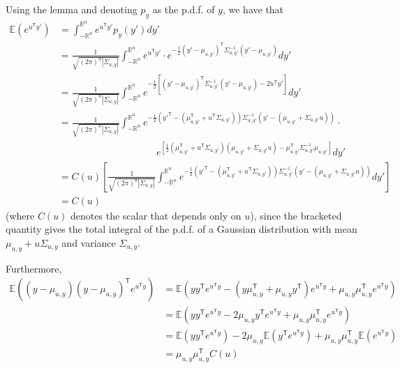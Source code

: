 \documentclass[a4paper,12pt]{article}
\theoremstyle{remark}
\newcommand{\transpose}{\mathsf{T}}
\begin{document}
    Using the lemma and denoting $p_y$ as the p.d.f. of $y$, we have that
    \begin{align*}
        \mathbb{E}(e^{u^\transpose y'}) &= \int_{-\mathbb{R}^n}^{\mathbb{R}^n} e^{u^\transpose y'} p_y(y') dy' \\
        &= \frac{1}{\sqrt{(2\pi)^n |\Sigma_{u, y}|}} \int_{-\mathbb{R}^n}^{\mathbb{R}^n} e^{u^\transpose y'} \cdot e^{-\frac{1}{2} (y' - \mu_{u, y'})^\transpose \Sigma_{u, y'}^{-1} (y' - \mu_{u, y'})} dy' \\
        &= \frac{1}{\sqrt{(2\pi)^n |\Sigma_{u, y}|}} \int_{-\mathbb{R}^n}^{\mathbb{R}^n} e^{-\frac{1}{2} [(y' - \mu_{u, y'})^\transpose \Sigma_{u, y'}^{-1} (y' - \mu_{u, y'}) - 2u^\transpose y']} dy' \\
        &= \frac{1}{\sqrt{(2\pi)^n |\Sigma_{u, y}|}} \int_{-\mathbb{R}^n}^{\mathbb{R}^n} e^{-\frac{1}{2} (y'^\transpose - (\mu_{u, y'}^\transpose + u^\transpose \Sigma_{u, y'})) \Sigma_{u, y'}^{-1} (y' - (\mu_{u, y'} + \Sigma_{u, y'} u))} \cdot \text{} \\
        &\qquad\qquad\qquad\qquad\qquad e^{[\frac{1}{2}(\mu_{u, y'}^\transpose + u^\transpose \Sigma_{u, y'})(\mu_{u, y'} + \Sigma_{u, y'} u) - \mu_{u, y'}^\transpose \Sigma_{u, y'}^{-1} \mu_{u, y'}]} dy' \\
        &= C(u) \left[ \frac{1}{\sqrt{(2\pi)^n |\Sigma_{u, y}|}} \int_{-\mathbb{R}^n}^{\mathbb{R}^n} e^{-\frac{1}{2} (y'^\transpose - (\mu_{u, y'}^\transpose + u^\transpose \Sigma_{u, y'})) \Sigma_{u, y'}^{-1} (y' - (\mu_{u, y'} + \Sigma_{u, y'} u))} dy' \right] \\
        &= C(u)
    \end{align*}
    (where $C(u)$ denotes the scalar that depends only on $u$), since the bracketed quantity gives the total integral of the p.d.f. of a Gaussian distribution with mean $\mu_{u, y} + u\Sigma_{u, y}$ and variance $\Sigma_{u, y}$. \par
    Furthermore,
    \begin{align*}
        \mathbb{E}((y - \mu_{u, y})(y - \mu_{u, y})^\transpose e^{u^\transpose y}) &= \mathbb{E}(yy^\transpose e^{u^\transpose y} - (y\mu_{u, y}^\transpose + \mu_{u, y} y^\transpose) e^{u^\transpose y} + \mu_{u, y} \mu_{u, y}^\transpose e^{u^\transpose y}) \\
        &= \mathbb{E}(yy^\transpose e^{u^\transpose y} - 2\mu_{u, y} y^\transpose e^{u^\transpose y} + \mu_{u, y} \mu_{u, y}^\transpose e^{u^\transpose y}) \\
        &= \mathbb{E}(yy^\transpose e^{u^\transpose y}) - 2\mu_{u, y} \mathbb{E}(y^\transpose e^{u^\transpose y}) + \mu_{u, y} \mu_{u, y}^\transpose \mathbb{E}(e^{u^\transpose y}) \\
        &= \mu_{u, y} \mu_{u, y}^\transpose C(u)
    \end{align*}
\end{document}
